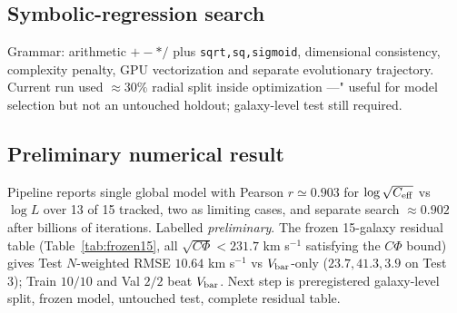 \documentclass[twocolumn]{aastex631}
\begin{document}
\subsection{Symbolic-regression search}

Grammar: arithmetic $+ - * /$ plus {\tt sqrt,sq,sigmoid}, dimensional consistency, complexity penalty, GPU vectorization and separate evolutionary trajectory. Current run used $\approx30\%$ radial split inside optimization ---" useful for model selection but not an untouched holdout; galaxy-level test still required.

\subsection{Preliminary numerical result}

Pipeline reports single global model with Pearson $r\simeq0.903$ for $\log\sqrt{C_{\rm eff}}$ vs $\log L$ over 13 of 15 tracked, two as limiting cases, and separate search $\approx0.902$ after billions of iterations. Labelled \emph{preliminary}. The frozen 15-galaxy residual table (Table~\ref{tab:frozen15}, all $\sqrt{C\Phi}<231.7$ km s$^{-1}$ satisfying the $C\Phi$ bound) gives Test $N$-weighted RMSE $10.64$ km s$^{-1}$ vs $V_{\rm bar}$-only ($23.7,41.3,3.9$ on Test 3); Train $10/10$ and Val $2/2$ beat $V_{\rm bar}$. Next step is preregistered galaxy-level split, frozen model, untouched test, complete residual table.
\end{document}

